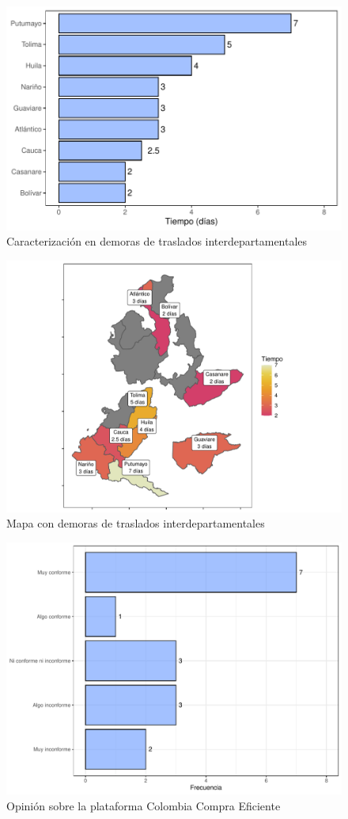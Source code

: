 \documentclass[
]{book}
\begin{document}
\begin{figure}
\includegraphics[width=0.85\linewidth]{InformeFinal_files/figure-latex/TiemposTranslados-1} \caption{Caracterización en demoras de traslados interdepartamentales}\label{fig:TiemposTranslados}
\end{figure}

\begin{figure}
\includegraphics[width=0.9\linewidth]{InformeFinal_files/figure-latex/TiemposTransladosMapa-1} \caption{Mapa con demoras de traslados interdepartamentales}\label{fig:TiemposTransladosMapa}
\end{figure}

\begin{figure}
\includegraphics[width=0.85\linewidth]{InformeFinal_files/figure-latex/ColombiaCompra-1} \caption{Opinión sobre la plataforma Colombia Compra Eficiente}\label{fig:ColombiaCompra}
\end{figure}
\end{document}
